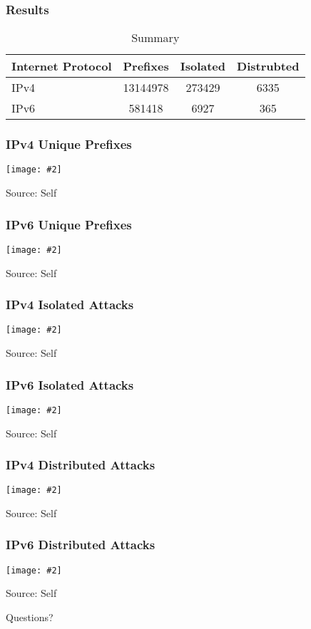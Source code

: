 \documentclass{beamer}
\newcommand{\framedgraphic}[3]{
    \begin{frame}
        \frametitle{#1}
        \begin{center}
            \texttt{[image: \#2]}
        \end{center}
        {\small Source: #3}
    \end{frame}
}
\begin{document}
\begin{frame}[fragile]
    \frametitle{Results}
    \begin{table}
        \begin{tabular}{l | c | c | c }
            Internet Protocol & Prefixes & Isolated & Distrubted \\
            \hline \hline
            IPv4 & 13144978 & 273429 & 6335 \\
            IPv6 & 581418 & 6927 & 365 \\
            \hline
        \end{tabular}
        \caption{Summary}
    \end{table}
\end{frame}

\framedgraphic{IPv4 Unique Prefixes}{pictures/v4_prefixes.png}{Self}
\framedgraphic{IPv6 Unique Prefixes}{pictures/v6_prefixes.png}{Self}
\framedgraphic{IPv4 Isolated Attacks}{pictures/v4_isolated.png}{Self}
\framedgraphic{IPv6 Isolated Attacks}{pictures/v6_isolated.png}{Self}
\framedgraphic{IPv4 Distributed Attacks}{pictures/v4_distributed.png}{Self}
\framedgraphic{IPv6 Distributed Attacks}{pictures/v6_distributed.png}{Self}

\begin{frame}

    {\Large Questions?}

\end{frame}
\end{document}
